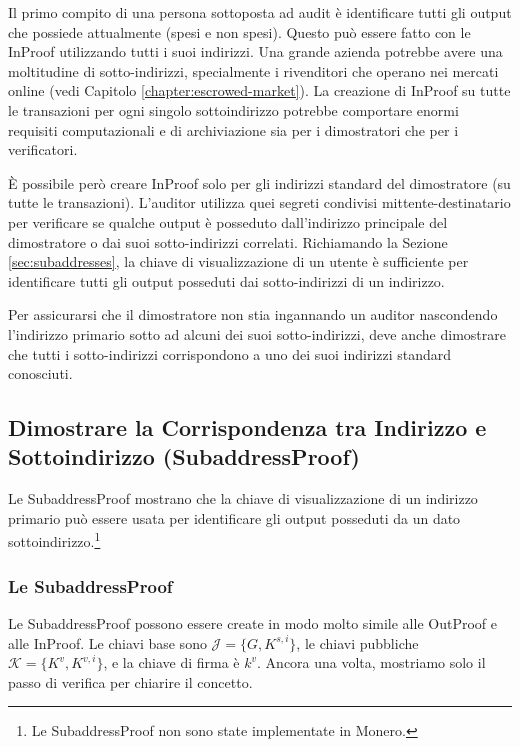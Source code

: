 Il primo compito di una persona sottoposta ad audit è identificare tutti gli output che possiede attualmente (spesi e non spesi). Questo può essere fatto con le InProof utilizzando tutti i suoi indirizzi. Una grande azienda potrebbe avere una moltitudine di sotto-indirizzi, specialmente i rivenditori che operano nei mercati online (vedi Capitolo 
\ref{chapter:escrowed-market}). La creazione di InProof su tutte le transazioni per ogni singolo sottoindirizzo potrebbe comportare enormi requisiti computazionali e di archiviazione sia per i dimostratori che per i verificatori.

È possibile però creare InProof solo per gli indirizzi standard del dimostratore (su tutte le transazioni). L'auditor utilizza quei segreti condivisi mittente-destinatario per verificare se qualche output è posseduto dall'indirizzo principale del dimostratore o dai suoi sotto-indirizzi correlati. Richiamando la Sezione \ref{sec:subaddresses}, la chiave di visualizzazione di un utente è sufficiente per identificare tutti gli output posseduti dai sotto-indirizzi di un indirizzo.

Per assicurarsi che il dimostratore non stia ingannando un auditor nascondendo l'indirizzo primario sotto ad alcuni dei suoi sotto-indirizzi, deve anche dimostrare che tutti i sotto-indirizzi corrispondono a uno dei suoi indirizzi standard conosciuti.


\subsection{Dimostrare la Corrispondenza tra Indirizzo e Sottoindirizzo (SubaddressProof)}
\label{subsec:proofs-address-subaddress-correspond-subaddressproof}

Le SubaddressProof mostrano che la chiave di visualizzazione di un indirizzo primario può essere usata per identificare gli output posseduti da un dato sottoindirizzo.\footnote{Le SubaddressProof non sono state implementate in Monero.}

\subsubsection*{Le SubaddressProof}
Le SubaddressProof possono essere create in modo molto simile alle OutProof e alle InProof. Le chiavi base sono $\mathcal{J} = \{G, K^{s,i}\}$, le chiavi pubbliche $\mathcal{K} = \{K^v, K^{v,i}\}$, e la chiave di firma è $k^v$. Ancora una volta, mostriamo solo il passo di verifica per chiarire il concetto.

